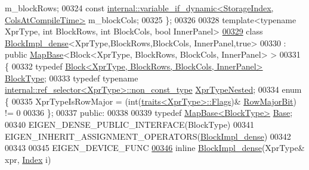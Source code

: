 \begin{DoxyCode}
       m\_blockRows;
00324     \textcolor{keyword}{const} \hyperlink{class_eigen_1_1internal_1_1variable__if__dynamic}{internal::variable\_if\_dynamic<StorageIndex, ColsAtCompileTime>}
       m\_blockCols;
00325 \};
00326 
00328 \textcolor{keyword}{template}<\textcolor{keyword}{typename} XprType, \textcolor{keywordtype}{int} BlockRows, \textcolor{keywordtype}{int} BlockCols, \textcolor{keywordtype}{bool} InnerPanel>
\hyperlink{class_eigen_1_1internal_1_1_block_impl__dense_3_01_xpr_type_00_01_block_rows_00_01_block_cols_00_01_inner_panel_00_01true_01_4}{00329} \textcolor{keyword}{class }\hyperlink{class_eigen_1_1internal_1_1_block_impl__dense}{BlockImpl\_dense}<XprType,BlockRows,BlockCols, InnerPanel,true>
00330   : \textcolor{keyword}{public} \hyperlink{class_eigen_1_1_map_base}{MapBase}<Block<XprType, BlockRows, BlockCols, InnerPanel> >
00331 \{
00332     \textcolor{keyword}{typedef} \hyperlink{group___core___module_class_eigen_1_1_block}{Block<XprType, BlockRows, BlockCols, InnerPanel>}
       \hyperlink{group___core___module_class_eigen_1_1_block}{BlockType};
00333     \textcolor{keyword}{typedef} \textcolor{keyword}{typename} \hyperlink{class_eigen_1_1internal_1_1_tensor_lazy_evaluator_writable}{internal::ref\_selector<XprType>::non\_const\_type}
       \hyperlink{class_eigen_1_1internal_1_1_tensor_lazy_evaluator_writable}{XprTypeNested};
00334     \textcolor{keyword}{enum} \{
00335       XprTypeIsRowMajor = (int(\hyperlink{struct_eigen_1_1internal_1_1traits}{traits<XprType>::Flags})&
      \hyperlink{group__flags_gae4f56c2a60bbe4bd2e44c5b19cbe8762}{RowMajorBit}) != 0
00336     \};
00337   \textcolor{keyword}{public}:
00338 
00339     \textcolor{keyword}{typedef} \hyperlink{class_eigen_1_1_map_base}{MapBase<BlockType>} \hyperlink{class_eigen_1_1_map_base}{Base};
00340     EIGEN\_DENSE\_PUBLIC\_INTERFACE(BlockType)
00341     EIGEN\_INHERIT\_ASSIGNMENT\_OPERATORS(\hyperlink{class_eigen_1_1internal_1_1_block_impl__dense}{BlockImpl\_dense})
00342 
00343     
00345     EIGEN\_DEVICE\_FUNC
\hyperlink{class_eigen_1_1internal_1_1_block_impl__dense_3_01_xpr_type_00_01_block_rows_00_01_block_cols_00_01_inner_panel_00_01true_01_4_a72b340bbcd3acefc375e7a5eacd790f5}{00346}     \textcolor{keyword}{inline} \hyperlink{class_eigen_1_1internal_1_1_block_impl__dense_3_01_xpr_type_00_01_block_rows_00_01_block_cols_00_01_inner_panel_00_01true_01_4_a72b340bbcd3acefc375e7a5eacd790f5}{BlockImpl\_dense}(XprType& xpr, \hyperlink{namespace_eigen_a62e77e0933482dafde8fe197d9a2cfde}{Index} i)

\end{DoxyCode}
